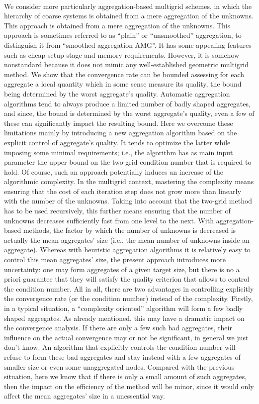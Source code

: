 \cite{agmg2}\\
We consider more particularly aggregation-based multigrid schemes, in which
the hierarchy of coarse systems is obtained from a mere aggregation of the
unknowns. This approach is obtained from a mere aggregation of the unknowns.
This approach is sometimes referred to as ``plain'' or ``unsmoothed''
aggregation, to distinguish it from ``smoothed aggregation AMG''. It has some
appealing features such as cheap setup stage and memory requirements. However,
it is somehow nonstandard because it does not mimic any well-established
geometric multigrid method. We show that the
convergence rate can be bounded assessing for each aggregate a local quantity
which in some sense measure its quality, the bound being determined by the
worst aggregate's quality. Automatic aggregation algorithms tend to always
produce a limited number of badly shaped aggregates, and since, the bound is
determined by the worst aggregate's quality, even a few of these can
significantly impact the resulting bound. Here we overcome these limitations
mainly by introducing a new aggregation algorithm based on the explicit
control of aggregate's quality. It tends to optimize the latter while imposing
some minimal requirements; i.e., the algorithm has as main input parameter the 
upper bound on the two-grid condition number that is required to hold. Of course, 
such an approach potentially induces an increase of the algorithmic complexity. 
In the multigrid context, mastering the complexity means ensuring that the cost of
each iteration step does not grow more than linearly with the number of the
unknowns. Taking into account that the two-grid method has to be used
recursively, this further means ensuring that the number of unknowns decreases
sufficiently fast from one level to the next. With aggregation-based methods,
the factor by which the number of unknowns is decreased is actually the mean
aggregates' size (i.e., the mean number of unknowns inside an aggregate).
Whereas with heuristic aggregation algorithms it is relatively easy to control
this mean aggregates' size, the present approach introduces more uncertainty:
one may form aggregates of a given target size, but there is no a priori
guarantee that they will satisfy the quality criterion that allows to control
the condition number. All in all, there are two advantages in controlling
explicitly the convergence rate (or the condition number) instead of the
complexity. Firstly, in a typical situation, a ``complexity oriented''
algorithm will form a few badly shaped aggregates. As already mentioned, this
may have a dramatic impact on the convergence analysis. If there are only a
few such bad aggregates, their influence on the actual convergence may or not
be significant, in general we just don't know. An algorithm that explicitly
controls the condition number will refuse to form these bad aggregates and
stay instead with a few aggregates of smaller size or even some unaggregated
nodes. Compared with the previous situation, here we know that if there is
only a small amount of such aggregates, then the impact on the efficiency of
the method will be minor, since it would only affect the mean aggregates' size
in a unessential way.

